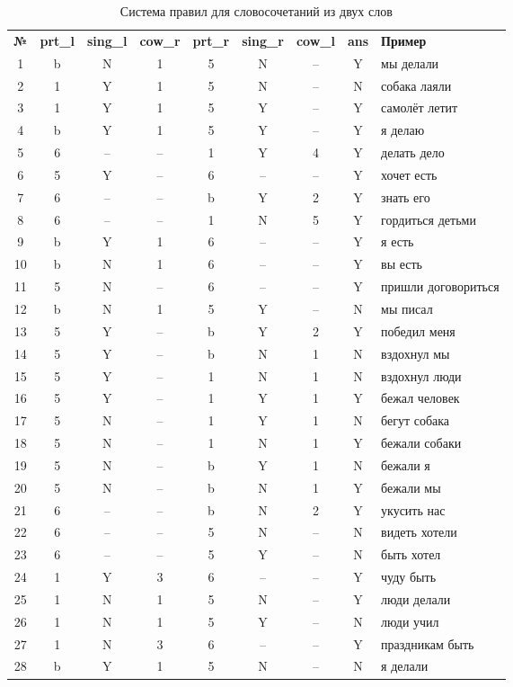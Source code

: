 \documentclass[main]{subfiles}
\begin{document}
\begin{longtable}[c]{|c|c|c|c|c|c|c|c|p{90px}|}
		\captionsetup{format=hang,labelsep = endash, singlelinecheck=false}
	\caption{Система правил для словосочетаний из двух слов}\\
			\hline
			\textbf{№}&\textbf{ prt\_l} &\textbf{sing\_l}  &\textbf{cow\_r} & \textbf{prt\_r }&\textbf{sing\_r }& \textbf{cow\_l} & \textbf{ans}  &\textbf{Пример} \\ \hline
			1 & b & N & 1 & 5 & N & --  & Y  & мы делали \\ \hline
			2 &  1 &Y & 1 & 5 & N & -- & N & собака лаяли\\ \hline
			3 & 1 & Y & 1 & 5 & Y & -- & Y & самолёт летит\\ \hline 
			4 & b & Y & 1 & 5 & Y & -- & Y & я делаю \\ \hline
			5&6&--&--&1&Y&4&Y&делать дело\\ \hline
			6&5&Y&--&6&--&--&Y&хочет есть\\ \hline
			7&6&--&--&b&Y&2&Y&знать его\\ \hline
			8&6&--&--&1&N&5&Y&гордиться детьми\\ \hline
			9&b&Y&1&6&--&--&Y&я есть\\ \hline
			10&b&N&1&6&--&--&Y&вы есть \\ \hline
			11&5&N&--&6&--&--&Y&пришли договориться\\ \hline
			12&b&N&1&5&Y&--&N&мы писал\\ \hline
			13&5&Y&--&b&Y&2&Y&победил меня\\ \hline
			14&5&Y&--&b&N&1&N&вздохнул мы\\ \hline
			15&5&Y&--&1&N&1&N&вздохнул люди\\ \hline
			16&5&Y&--&1&Y&1&Y&бежал человек \\ \hline
			17&5&N&--&1&Y&1&N&бегут собака\\ \hline
			18&5&N&--&1&N&1&Y& бежали собаки\\ \hline
			19&5&N&--&b&Y&1&N&бежали я\\ \hline
			20&5&N&--&b&N&1&Y&бежали мы\\ \hline
			21&6&--&--&b&N&2&Y&укусить нас\\ \hline
			22&6&--&--&5&N&--&N&видеть хотели\\ \hline
			23&6&--&--&5&Y&--&N&быть хотел\\ \hline
			24&1&Y&3&6&--&--&Y&чуду быть\\ \hline
			25&1&N&1&5&N&--&Y&люди делали\\ \hline
			26&1&N&1&5&Y&--&N&люди учил\\ \hline
			27&1&N&3&6&--&--&Y&праздникам быть\\ \hline
			28&b&Y&1&5&N&--&N&я делали\\ \hline
\end{longtable}
\end{document}
